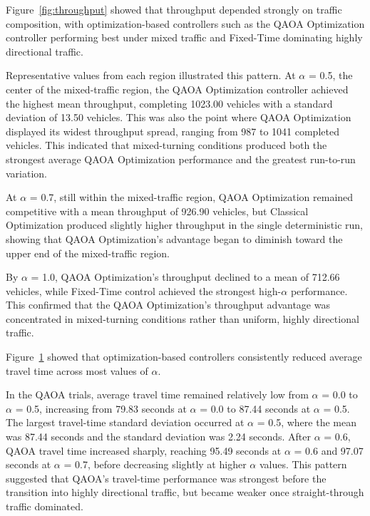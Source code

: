 \documentclass[12pt]{article}
\begin{document}
Figure~\ref{fig:throughput} showed that throughput depended strongly on traffic composition, with optimization-based controllers such as the QAOA Optimization controller performing best under mixed traffic and Fixed-Time dominating highly directional traffic.

Representative values from each region illustrated this pattern. At $\alpha$ = 0.5, the center of the mixed-traffic region, the QAOA Optimization controller achieved the highest mean throughput, completing 1023.00 vehicles with a standard deviation of 13.50 vehicles. This was also the point where QAOA Optimization displayed its widest throughput spread, ranging from 987 to 1041 completed vehicles. This indicated that mixed-turning conditions produced both the strongest average QAOA Optimization performance and the greatest run-to-run variation. 

At $\alpha$ = 0.7, still within the mixed-traffic region, QAOA Optimization remained competitive with a mean throughput of 926.90 vehicles, but Classical Optimization produced slightly higher throughput in the single deterministic run, showing that QAOA Optimization’s advantage began to diminish toward the upper end of the mixed-traffic region. 

By $\alpha$ = 1.0, QAOA Optimization’s throughput declined to a mean of 712.66 vehicles, while Fixed-Time control achieved the strongest high-$\alpha$ performance. This confirmed that the QAOA Optimization’s throughput advantage was concentrated in mixed-turning conditions rather than uniform, highly directional traffic.


\begin{figure}[htbp]
\label{fig:traveltime-alpha}
\end{figure}

Figure~\ref{fig:traveltime-alpha} showed that optimization-based controllers consistently reduced average travel time across most values of $\alpha$.

In the QAOA trials, average travel time remained relatively low from $\alpha$ = 0.0 to $\alpha$ = 0.5, increasing from 79.83 seconds at $\alpha$ = 0.0 to 87.44 seconds at $\alpha$ = 0.5. The largest travel-time standard deviation occurred at $\alpha$ = 0.5, where the mean was 87.44 seconds and the standard deviation was 2.24 seconds. After $\alpha$ = 0.6, QAOA travel time increased sharply, reaching 95.49 seconds at $\alpha$ = 0.6 and 97.07 seconds at $\alpha$ = 0.7, before decreasing slightly at higher $\alpha$ values. This pattern suggested that QAOA’s travel-time performance was strongest before the transition into highly directional traffic, but became weaker once straight-through traffic dominated. 
\end{document}
